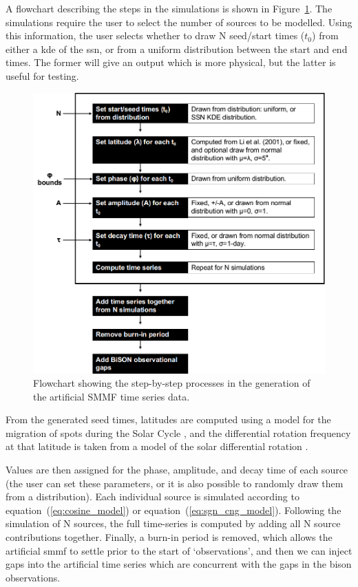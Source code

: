 A flowchart describing the steps in the simulations is shown in Figure~\ref{fig:flowchart}. The simulations require the user to select the number of sources to be modelled. Using this information, the user selects whether to draw N seed/start times ($t_0$) from either a \gls{kde} of the \gls{ssn}, or from a uniform distribution between the start and end times. The former will give an output which is more physical, but the latter is useful for testing.


\begin{figure}[ht!]
	\centering
	\includegraphics[width=0.85\columnwidth]{flow_chart_2.png}
	\caption{Flowchart showing the step-by-step processes in the generation of the artificial SMMF time series data.}
	\label{fig:flowchart}
\end{figure}


From the generated seed times, latitudes are computed using a model for the migration of spots during the Solar Cycle \citep{li_latitude_2001-1}, and the differential rotation frequency at that latitude is taken from a model of the solar differential rotation \citep{snodgrass_magnetic_1983}. 

Values are then assigned for the phase, amplitude, and decay time of each source (the user can set these parameters, or it is also possible to randomly draw them from a distribution). Each individual source is simulated according to equation~(\ref{eq:cosine_model}) or equation~(\ref{eq:sgn_cng_model}). Following the simulation of N sources, the full time-series is computed by adding all N source contributions together. Finally, a burn-in period is removed, which allows the artificial \gls{smmf} to settle prior to the start of `observations', and then we can inject gaps into the artificial time series which are concurrent with the gaps in the \gls{bison} observations.

